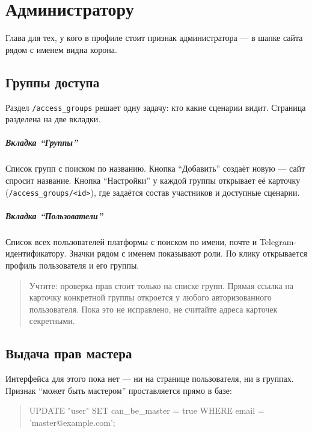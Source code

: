 \chapter{Администратору}
\label{ch:admin}

Глава для тех, у кого в профиле стоит признак администратора --- в шапке сайта рядом с именем видна корона.

\section{Группы доступа}
\label{sec:admin:groups}

Раздел \texttt{/access\_groups} решает одну задачу: кто какие сценарии видит. Страница разделена на две вкладки.

\paragraph{Вкладка ``Группы''}
Список групп с поиском по названию. Кнопка ``Добавить'' создаёт новую --- сайт спросит название. Кнопка ``Настройки'' у каждой группы открывает её карточку (\texttt{/access\_groups/<id>}), где задаётся состав участников и доступные сценарии.

\paragraph{Вкладка ``Пользователи''}
Список всех пользователей платформы с поиском по имени, почте и Telegram-идентификатору. Значки рядом с именем показывают роли. По клику открывается профиль пользователя и его группы.

\begin{quote}
\small
Учтите: проверка прав стоит только на списке групп. Прямая ссылка на карточку конкретной группы откроется у любого авторизованного пользователя. Пока это не исправлено, не считайте адреса карточек секретными.
\end{quote}

\section{Выдача прав мастера}
\label{sec:admin:grant-master}

Интерфейса для этого пока нет --- ни на странице пользователя, ни в группах. Признак ``может быть мастером'' проставляется прямо в базе:

\begin{quote}
\ttfamily\small
UPDATE "user" SET can\_be\_master = true WHERE email = 'master@example.com';
\end{quote}

